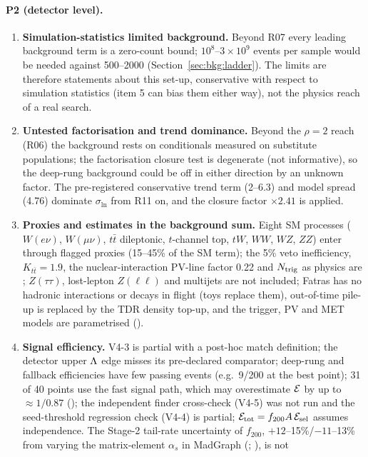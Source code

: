 \paragraph{P2 (detector level).}
\begin{enumerate}[resume]
\item \textbf{Simulation-statistics limited background.} Beyond R07 every leading background term is a zero-count bound;
  $10^8$--$3\times10^9$ events per sample would be needed against 500--2000 (Section~\ref{sec:bkg:ladder}). The limits are
  therefore statements about this set-up, conservative with respect to simulation statistics (item 5 can bias them either
  way), not the physics reach of a real search.
\item \textbf{Untested factorisation and trend dominance.} Beyond the $\rho=2$ reach (R06) the background rests on
  conditionals measured on substitute populations; the factorisation closure test is degenerate (not informative), so the
  deep-rung background could be off in either direction by an unknown factor. The pre-registered conservative trend term
  (2--6.3) and model spread (4.76) dominate $\sigma_{\ln}$ from R11 on, and the closure factor $\times2.41$ is applied.
\item \textbf{Proxies and estimates in the background sum.} Eight SM processes ($W(e\nu)$, $W(\mu\nu)$, $t\bar t$ dileptonic, $t$-channel top, $tW$, $WW$, $WZ$, $ZZ$) enter through flagged proxies (15--45\% of the
  SM term); the 5\% veto inefficiency, $K_{t\bar t}=1.9$, the nuclear-interaction PV-line factor 0.22 and $N_{\rm trig}$ as physics
  are \EST{}; $Z(\tau\tau)$, lost-lepton $Z(\ell\ell)$ and multijets are not included; Fatras has no hadronic interactions or
  decays in flight (toys replace them), out-of-time pile-up is replaced by the TDR density top-up, and the trigger, PV and
  MET models are parametrised (\UNV{}).
\item \textbf{Signal efficiency.} V4-3 is partial with a post-hoc match definition; the detector upper $\Lambda$ edge misses
  its pre-declared comparator; deep-rung and fallback efficiencies have few passing events (e.g.\ 9/200 at the best point);
  31 of 40 points use the fast signal path, which may overestimate $\mathcal{E}$ by up to $\approx1/0.87$ (\EST{}); the independent
  finder cross-check (V4-5) was not run and the seed-threshold regression check (V4-4) is partial;
  $\mathcal{E}_{\rm tot}=f_{200}A\,\mathcal{E}_{\rm sel}$ assumes independence. The Stage-2 tail-rate uncertainty of $f_{200}$,
  $+12$--15\%/$-11$--13\% from varying the matrix-element $\alpha_s$ in MadGraph (\EST{}; ), is not

\end{enumerate}
